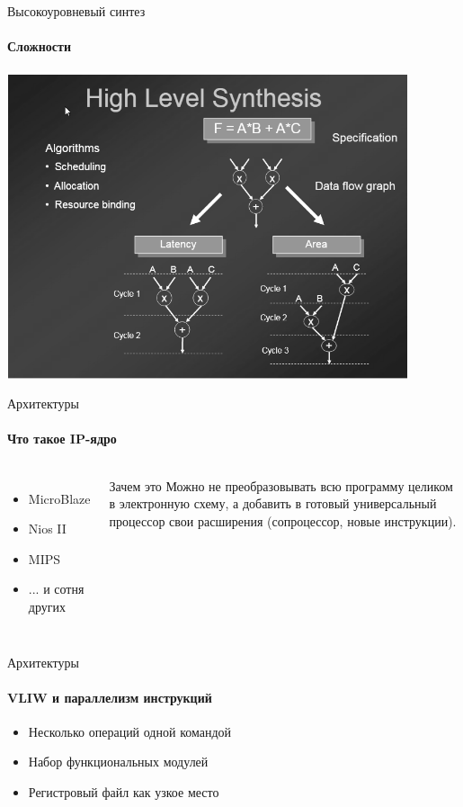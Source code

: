 \documentclass{beamer}              %
\begin{document}
\begin{frame}{Высокоуровневый синтез}
  \framesubtitle{Сложности}
  \includegraphics[height=9cm]{img/HLSFlow1.png}
\end{frame}

\begin{frame}{Архитектуры}
  \framesubtitle{Что такое IP-ядро}
  
  \begin{columns}
      \begin{itemize}
          \item MicroBlaze
          \item Nios II
          \item MIPS
          \item ... и сотня других
  		\end{itemize}

      \begin{block}{Зачем это}
         Можно не преобразовывать всю программу целиком в электронную схему,
         а добавить в готовый универсальный процессор свои расширения (сопроцессор, новые инструкции).
      \end{block}
  \end{columns}	
  
  
\end{frame}

\begin{frame}{Архитектуры}
  \framesubtitle{VLIW и параллелизм инструкций}
  \begin{itemize}
          \item Несколько операций одной командой
          \item Набор функциональных модулей
          \item Регистровый файл как узкое место
  	\end{itemize}
  
\end{frame}
\end{document}
